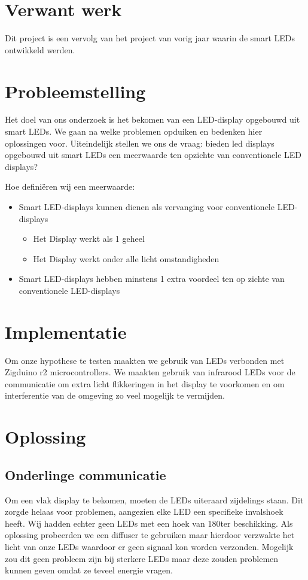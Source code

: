 \documentclass{article}
\begin{document}
\section{Verwant werk}
Dit project is een vervolg van het project van vorig jaar waarin de smart LEDs ontwikkeld werden. 


\section{Probleemstelling}

Het doel van ons onderzoek is het bekomen van een LED-display opgebouwd uit smart LEDs. We gaan na welke problemen opduiken en bedenken hier oplossingen voor. Uiteindelijk stellen we ons de vraag: bieden led displays opgebouwd uit smart LEDs een meerwaarde ten opzichte van conventionele LED displays? 

\smallskip

Hoe definiëren wij een meerwaarde:
\begin{itemize}
\item Smart LED-displays kunnen dienen als vervanging voor conventionele LED-displays
\begin{itemize}
\item Het Display werkt als 1 geheel
\item Het Display werkt onder alle licht omstandigheden
\end{itemize}
\item Smart LED-displays hebben minstens 1 extra voordeel ten op zichte van conventionele LED-displays
\end{itemize}

\smallskip


\section{Implementatie}
Om onze hypothese te testen maakten we gebruik van LEDs verbonden met Zigduino r2 microcontrollers. We maakten gebruik van infrarood LEDs voor de communicatie om extra licht flikkeringen in het display te voorkomen en om interferentie van de omgeving zo veel mogelijk te vermijden.


\section{Oplossing}

\subsection{Onderlinge communicatie}
Om een vlak display te bekomen, moeten de LEDs uiteraard zijdelings staan. Dit zorgde helaas voor problemen, aangezien elke LED een specifieke invalshoek heeft. Wij hadden echter geen LEDs met een hoek van 180\degree ter beschikking. Als oplossing probeerden we een diffuser te gebruiken maar hierdoor verzwakte het licht van onze LEDs waardoor er geen signaal kon worden verzonden. Mogelijk zou dit geen probleem zijn bij sterkere LEDs maar deze zouden problemen kunnen geven omdat ze teveel energie vragen. 
\end{document}
